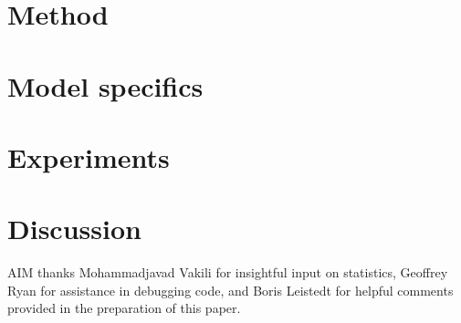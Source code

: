 \documentclass[preprint]{aastex}
\begin{document}
\section{Method}
\label{sec:method}

\section{Model specifics}
\label{sec:model_specifics}

\section{Experiments}
\label{sec:experiments}

\section{Discussion}
\label{sec:discussion}


\begin{acknowledgements}
AIM thanks Mohammadjavad Vakili for insightful input on statistics, Geoffrey Ryan for assistance in debugging code, and Boris Leistedt for helpful comments provided in the preparation of this paper.
\end{acknowledgements}



\end{document}

